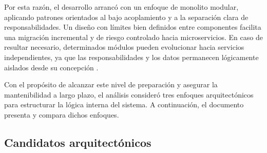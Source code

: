 Por esta razón, el desarrollo arrancó con un enfoque de monolito modular, aplicando patrones orientados al bajo acoplamiento y a la separación clara de responsabilidades. 
Un diseño con límites bien definidos entre componentes facilita una migración incremental y de riesgo controlado hacia microservicios. 
En caso de resultar necesario, determinados módulos pueden evolucionar hacia servicios independientes, ya que las responsabilidades y los datos permanecen lógicamente aislados desde su concepción \cite{docker_microservices_need}.


Con el propósito de alcanzar este nivel de preparación y asegurar la mantenibilidad a largo plazo, el análisis consideró tres enfoques arquitectónicos para estructurar la lógica interna del sistema.
A continuación, el documento presenta y compara dichos enfoques.

\subsection{Candidatos arquitectónicos}
\label{subsection:filosofia_candidatas}

